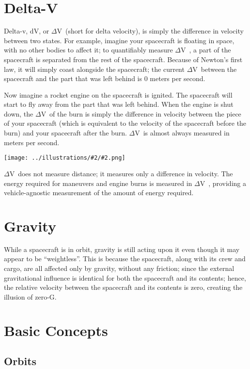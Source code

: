 \documentclass[oneside,a5paper]{book}
\newcommand{\dv}{$\Delta$\hspace{-0.2ex}V}
\newcommand{\widthillustration}[2]{{\centering\texttt{[image: ../illustrations/\#2/\#2.png]}}}
\newcommand{\illustration}[1]{\widthillustration{\linewidth}{#1}}
\begin{document}
\section{Delta-V}

Delta-v, dV, or \dv\ (short for delta velocity), is simply the
difference in velocity between two states. For example, imagine your
spacecraft is floating in space, with no other bodies to affect it; to
quantifiably measure \dv\ , a part of the spacecraft is separated from
the rest of the spacecraft. Because of Newton’s first law, it will
simply coast alongside the spacecraft; the current \dv\ between the
spacecraft and the part that was left behind is 0 meters per second.

Now imagine a rocket engine on the spacecraft is ignited. The
spacecraft will start to fly away from the part that was left
behind. When the engine is shut down, the \dv\ of the burn is simply the
difference in velocity between the piece of your spacecraft (which is
equivalent to the velocity of the spacecraft before the burn) and your
spacecraft after the burn. \dv\ is almost always measured in meters per
second.

\illustration{delta-v}

\dv\ does not measure distance; it measures only a difference in
velocity. The energy required for maneuvers and engine burns is
measured in \dv\ , providing a vehicle-agnostic measurement of the amount
of energy required.

\section{Gravity}

While a spacecraft is in orbit, gravity is still acting upon it even
though it may appear to be ``weightless''. This is because the
spacecraft, along with its crew and cargo, are all affected only by
gravity, without any friction; since the external gravitational
influence is identical for both the spacecraft and its contents;
hence, the relative velocity between the spacecraft and its contents
is zero, creating the illusion of zero-G.

\section{Basic Concepts}

\subsection{Orbits}
\end{document}
